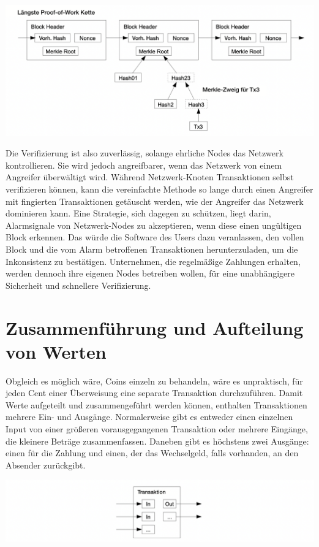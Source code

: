 \documentclass[9pt]{article}
\begin{document}
	\begin{center}
		\includegraphics[width=\textwidth]{pics/spv.png}
	\end{center}
	
    Die Verifizierung ist also zuverlässig, solange ehrliche Nodes das Netzwerk kontrollieren. Sie wird jedoch angreifbarer, wenn das Netzwerk von einem Angreifer überwältigt wird. Während Netzwerk-Knoten Transaktionen selbst verifizieren können, kann die vereinfachte Methode so lange durch einen Angreifer mit fingierten Transaktionen getäuscht werden, wie der Angreifer das Netzwerk dominieren kann. Eine Strategie, sich dagegen zu schützen, liegt darin, Alarmsignale von Netzwerk-Nodes zu akzeptieren, wenn diese einen ungültigen Block erkennen. Das würde die Software des Users dazu veranlassen, den vollen Block und die vom Alarm betroffenen Transaktionen herunterzuladen, um die Inkonsistenz zu bestätigen. Unternehmen, die regelmäßige Zahlungen erhalten, werden dennoch ihre eigenen Nodes betreiben wollen, für eine unabhängigere Sicherheit und schnellere Verifizierung.

	\section{Zusammenführung und Aufteilung von Werten}
	
    Obgleich es möglich wäre, Coins einzeln zu behandeln, wäre es unpraktisch, für jeden Cent einer Überweisung eine separate Transaktion durchzuführen. Damit Werte aufgeteilt und zusammengeführt werden können, enthalten Transaktionen mehrere Ein- und Ausgänge. Normalerweise gibt es entweder einen einzelnen Input von einer größeren vorausgegangenen Transaktion oder mehrere Eingänge, die kleinere Beträge zusammenfassen. Daneben gibt es höchstens zwei Ausgänge: einen für die Zahlung und einen, der das Wechselgeld, falls vorhanden, an den Absender zurückgibt.
	
	\begin{center}
		\includegraphics[width=\textwidth]{pics/combineandsplit.png}
	\end{center}
	
\end{document}
